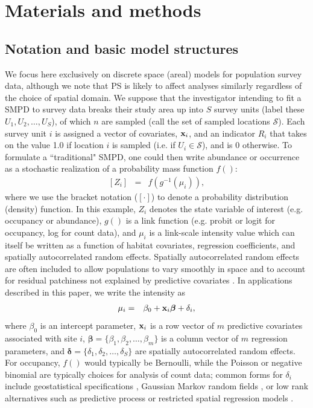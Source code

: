\documentclass[times,mee,doublespace,]{besauth2}
\begin{document}
\section{Materials and methods}


\subsection{Notation and basic model structures}

We focus here exclusively on discrete space (areal) models for population survey data, although we note that PS is likely to affect analyses similarly regardless of the choice of spatial domain.  We suppose that the investigator intending to fit a SMPD to survey data breaks their study area up into $S$ survey units (label these $U_1, U_2, \hdots, U_S$), of which $n$ are sampled (call the set of sampled locations $\mathcal{S}$). Each survey unit $i$ is assigned a vector of covariates, ${\bf x}_i$, and an indicator $R_i$ that takes on the value 1.0 if location $i$ is sampled (i.e. if $U_i \in \mathcal{S}$), and is 0 otherwise.  To formulate a ``traditional" SMPD, one could then write abundance or occurrence as a stochastic realization of a probability mass function $f()$:
\begin{eqnarray}
  \label{eq:process}
  [Z_i] & = & f(g^{-1}(\mu_i)),
\end{eqnarray}
where we use the bracket notation ($[\cdot]$) to denote a probability distribution (density) function.  In this example, $Z_i$ denotes the state variable of interest (e.g. occupancy or abundance), $g()$ is a link function (e.g. probit or logit for occupancy, log for count data), and $\mu_i$ is a link-scale intensity value which can itself be written as a function of habitat covariates, regression coefficients, and spatially autocorrelated random effects.  Spatially autocorrelated random effects are often included to allow populations to vary smoothly in space and to account for residual patchiness not explained by predictive covariates \citep{Legendre1993,LichsteinEtAl2002}. In applications described in this paper, we write the intensity as
\begin{eqnarray}
\mu_i & = & \beta_0 + {\bf x}_i \boldsymbol{\beta}+\delta_i,
 \label{eq:mu}
\end{eqnarray}
where $\beta_0$ is an intercept parameter, ${\bf x}_i$ is a row vector of $m$ predictive covariates associated with site $i$, $\boldsymbol{\beta} = \{ \beta_1, \beta_2, \hdots, \beta_m \}$ is a column vector of $m$ regression parameters, and $\boldsymbol{\delta}=\{ \delta_1,\delta_2,\hdots,\delta_S \}$ are spatially autocorrelated random effects.  For occupancy, $f()$ would typically be Bernoulli, while the Poisson or negative binomial are typically choices for analysis of count data; common forms for $\delta_i$ include geostatistical specifications \citep{Cressie1993,DiggleEtAl1998}, Gaussian Markov random fields \citep[e.g. conditionally autoregressive models;][]{RueHeld2005}, or low rank alternatives such as predictive process \citep{BanerjeeEtAl2008,LatimerEtAl2009} or restricted spatial regression models \citep{ReichEtAl2006,Hughes2013}.
\end{document}
